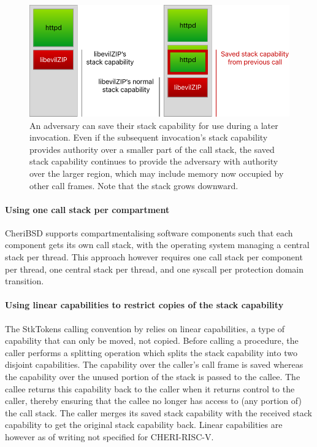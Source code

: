 \documentclass[main.tex]{subfiles}
\begin{document}
\begin{figure}
	\begin{center}
		\includegraphics{Images/Saved Stack Cap.pdf}
	\end{center}
	\caption{An adversary can save their stack capability for use during a later invocation. Even if the subsequent invocation's stack capability provides authority over a smaller part of the call stack, the saved stack capability continues to provide the adversary with authority over the larger region, which may include memory now occupied by other call frames. Note that the stack grows downward.}
	\label{fig:savedstackcap}
\end{figure}

\paragraph{Using one call stack per compartment} CheriBSD supports compartmentalising software components such that each component gets its own call stack, with the operating system managing a central stack per thread. This approach however requires one call stack per component per thread, one central stack per thread, and one syscall per protection domain transition.\cite{compartment}

\paragraph{Using linear capabilities to restrict copies of the stack capability} The StkTokens calling convention by \cite{stktokens} relies on linear capabilities, a type of capability that can only be moved, not copied. Before calling a procedure, the caller performs a splitting operation which splits the stack capability into two disjoint capabilities. The capability over the caller's call frame is saved whereas the capability over the unused portion of the stack is passed to the callee. The callee returns this capability back to the caller when it returns control to the caller, thereby ensuring that the callee no longer has access to (any portion of) the call stack. The caller merges its saved stack capability with the received stack capability to get the original stack capability back. Linear capabilities are however as of writing not specified for CHERI-RISC-V.
\end{document}
